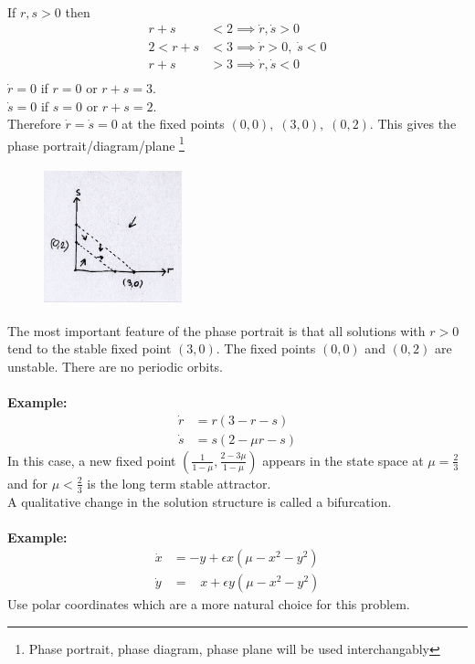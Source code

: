 \documentclass{article}
\newcommand{\example}{\textbf{Example:}}                    %
\begin{document}
\\
If $r,s >0$ then
\begin{align*}
r+s &< 2 \implies \dot{r}, \dot{s} > 0 \\
2 < r+s &< 3 \implies \dot{r} >0 , \; \dot{s} < 0 \\
r+s &> 3 \implies \dot{r}, \dot{s} < 0 \\
\end{align*}
$\dot{r} = 0$ if $r=0$ or $r+s = 3$. \\
$\dot{s} = 0$ if $s=0$ or $r+s = 2$. \\
Therefore $\dot{r} = \dot{s} = 0$ at the fixed points $(0,0), \; (3,0), \; (0,2)$.
This gives the phase portrait/diagram/plane%
\footnote{Phase portrait, phase diagram, phase plane will be used interchangably}
\begin{figure}[H]
\centering
\includegraphics[width=4cm, height=4cm]{fig0.png}
\end{figure}
The most important feature of the phase portrait is that all solutions with 
$r >0$ tend to the stable fixed point $(3,0)$. The fixed points $(0,0)$ and
$(0,2)$ are unstable. There are no periodic orbits.
\\
\\
\example\   
\begin{align*}
\dot{r} &= r(3 - r -s) \\
\dot{s} &= s(2 - \mu r -s)
\end{align*}
In this case, a new fixed point $(\frac{1}{1- \mu} , \frac{2 - 3 \mu}{1- \mu})$
appears in the state space at $\mu = \frac{2}{3}$ and for $\mu < \frac{2}{3}$ 
is the long term stable attractor. 
\\
A qualitative change in the solution structure is called a bifurcation.
\\
\\
\example\   
\begin{align*}
\dot{x} &= -y + \epsilon x (\mu - x^2 - y^2) \\
\dot{y} &= \;\;\; x + \epsilon y (\mu - x^2 - y^2)
\end{align*}
Use polar coordinates which are a more natural choice for this problem.
\end{document}
